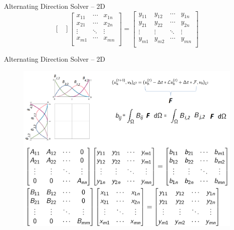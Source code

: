 \documentclass[c]{beamer}
\begin{document}
\begin{frame}[fragile]{Alternating Direction Solver -- 2D}
\begin{equation*}
\begin{bmatrix}
  \end{bmatrix}
  \begin{bmatrix}
    x_{11} & \cdots & x_{1n} \\
    x_{21} & \cdots & x_{2n} \\
    \vdots & \ddots & \vdots \\
    x_{m1} & \cdots & x_{mn} \\
  \end{bmatrix}
  =
  \begin{bmatrix}
    y_{11} &
    y_{12} & \cdots &
    y_{1n} \\
    y_{21} & y_{22} & \cdots & y_{2n} \\
    \vdots & \vdots & \ddots & \vdots \\
    y_{m1} &
    y_{m2} & \cdots &
    y_{mn} \\
  \end{bmatrix}
\end{equation*}

\end{frame}



\begin{frame}[fragile]{Alternating Direction Solver -- 2D}
\begin{figure}
  \centering
  \includegraphics[width=1.0\textwidth]{img/RHS}
\end{figure}
\end{frame}
\end{document}
